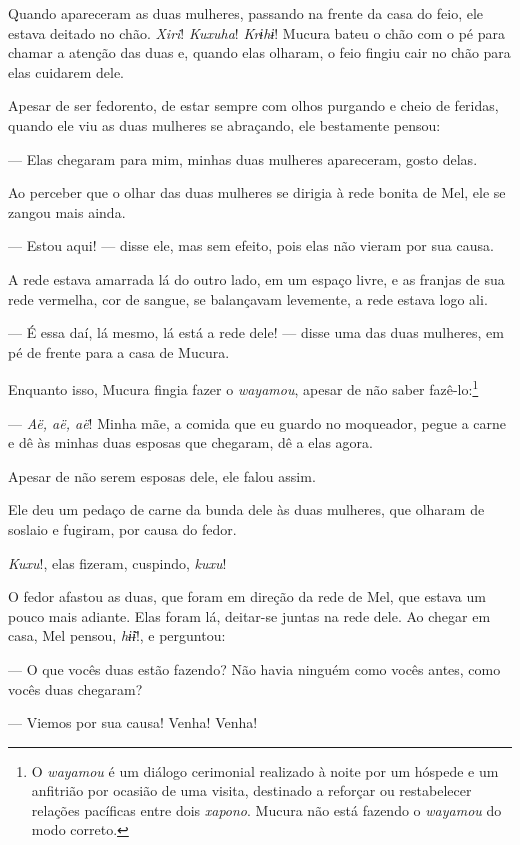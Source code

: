 Quando apareceram as duas mulheres, passando na frente da casa do feio,
ele estava deitado no chão. \textit{Xiri}! \textit{Kuxuha}! \textit{Krɨhɨ}! Mucura bateu o chão com o pé para chamar a atenção das duas e, quando elas olharam, o feio fingiu cair no chão para elas cuidarem dele.

Apesar de ser fedorento, de estar sempre com olhos purgando e cheio de
feridas, quando ele viu as duas mulheres se abraçando, ele bestamente
pensou:

--- Elas chegaram para mim, minhas duas mulheres apareceram, gosto
delas. 

Ao perceber que o olhar das duas mulheres se dirigia à rede bonita de
Mel, ele se zangou mais ainda. 

--- Estou aqui! --- disse ele, mas sem efeito, pois elas não vieram por
sua causa.

A rede estava amarrada lá do outro lado, em um espaço livre, e as
franjas de sua rede vermelha, cor de sangue, se balançavam levemente, a
rede estava logo ali. 

--- É essa daí, lá mesmo, lá está a rede dele! --- disse uma das duas
mulheres, em pé de frente para a casa de Mucura. 

Enquanto isso, Mucura fingia fazer o \textit{wayamou}, apesar de não saber
fazê-lo:\footnote{O \textit{wayamou} é um diálogo cerimonial realizado à noite por um hóspede e um anfitrião por ocasião de uma visita, destinado a reforçar ou restabelecer relações pacíficas entre dois \textit{xapono}. Mucura não está fazendo o \textit{wayamou} do modo correto.} 

--- \textit{Aë, aë, aë}! Minha mãe, a comida que eu guardo no moqueador,
pegue a carne e dê às minhas duas esposas que chegaram, dê a elas
agora. 

Apesar de não serem esposas dele, ele falou assim. 

Ele deu um pedaço de carne da bunda dele às duas mulheres, que olharam
de soslaio e fugiram, por causa do fedor. 

\textit{Kuxu}!, elas fizeram, cuspindo, \textit{kuxu}!

O fedor afastou as duas, que foram em direção da rede de Mel, que estava um pouco mais adiante. Elas foram lá, deitar-se juntas na rede
dele. Ao chegar em casa, Mel pensou, \textit{hɨ̃ɨ}!, e perguntou:

--- O que vocês duas estão fazendo? Não havia ninguém como vocês antes,
como vocês duas chegaram?

--- Viemos por sua causa! Venha! Venha! 


